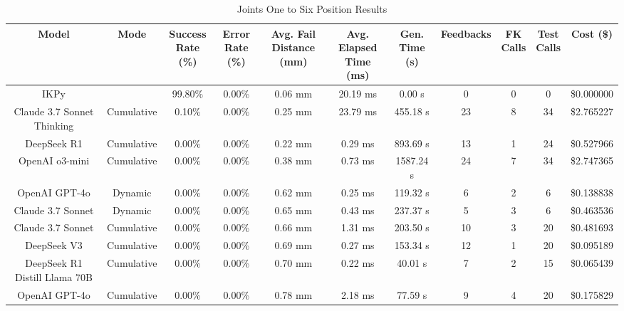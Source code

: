 \begin{table}[H]
\tiny
\renewcommand{\arraystretch}{1.2}
\caption{Joints One to Six Position Results}
\begin{center}
\begin{tabular}{|c|c|c|c|c|c|c|c|c|c|c|}
    \hline
    \textbf{Model} & 
    \textbf{Mode} & 
    \makecell{\textbf{Success}\\\textbf{Rate (\%)}} &
    \makecell{\textbf{Error}\\\textbf{Rate (\%)}} &
    \makecell{\textbf{Avg. Fail}\\\textbf{Distance (mm)}} &
    \makecell{\textbf{Avg. Elapsed}\\\textbf{Time (ms)}} &
    \makecell{\textbf{Gen.}\\\textbf{Time (s)}} &
    \textbf{Feedbacks} &
    \makecell{\textbf{FK}\\\textbf{Calls}} &
    \makecell{\textbf{Test}\\\textbf{Calls}} &
    \textbf{Cost (\$)} \\
    \hline
    IKPy &  & 99.80\% & 0.00\% & 0.06 mm & 20.19 ms & 0.00 s & 0 & 0 & 0 & \$0.000000 \\
    \hline
    Claude 3.7 Sonnet Thinking & Cumulative & 0.10\% & 0.00\% & 0.25 mm & 23.79 ms & 455.18 s & 23 & 8 & 34 & \$2.765227 \\
    \hline
    DeepSeek R1 & Cumulative & 0.00\% & 0.00\% & 0.22 mm & 0.29 ms & 893.69 s & 13 & 1 & 24 & \$0.527966 \\
    \hline
    OpenAI o3-mini & Cumulative & 0.00\% & 0.00\% & 0.38 mm & 0.73 ms & 1587.24 s & 24 & 7 & 34 & \$2.747365 \\
    \hline
    OpenAI GPT-4o & Dynamic & 0.00\% & 0.00\% & 0.62 mm & 0.25 ms & 119.32 s & 6 & 2 & 6 & \$0.138838 \\
    \hline
    Claude 3.7 Sonnet & Dynamic & 0.00\% & 0.00\% & 0.65 mm & 0.43 ms & 237.37 s & 5 & 3 & 6 & \$0.463536 \\
    \hline
    Claude 3.7 Sonnet & Cumulative & 0.00\% & 0.00\% & 0.66 mm & 1.31 ms & 203.50 s & 10 & 3 & 20 & \$0.481693 \\
    \hline
    DeepSeek V3 & Cumulative & 0.00\% & 0.00\% & 0.69 mm & 0.27 ms & 153.34 s & 12 & 1 & 20 & \$0.095189 \\
    \hline
    DeepSeek R1 Distill Llama 70B & Cumulative & 0.00\% & 0.00\% & 0.70 mm & 0.22 ms & 40.01 s & 7 & 2 & 15 & \$0.065439 \\
    \hline
    OpenAI GPT-4o & Cumulative & 0.00\% & 0.00\% & 0.78 mm & 2.18 ms & 77.59 s & 9 & 4 & 20 & \$0.175829 \\

\end{tabular}
\end{center}
\end{table}
